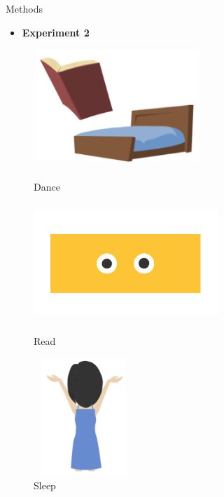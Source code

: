 \documentclass[final]{beamer}
\newlength{\colwidth}
\begin{document}
\begin{frame}[t]
\begin{columns}[t]
\begin{column}{\colwidth}
\begin{block}{Methods}
    \vspace{-0.3in}

    \begin{itemize}
      \item \textbf{Experiment 2}
    \end{itemize}
    \begin{figure}
      \begin{minipage}[t]{0.18\linewidth}
        \centering
        \includegraphics[width=2.5in, height=1.75in]{figures/fraw.png}
        \caption{Dance}
      \end{minipage}
      \begin{minipage}[t]{0.18\linewidth}
        \centering
        \includegraphics[width=2.75in, height=1.75in]{figures/gobb.png}
        \caption{Read}
      \end{minipage}%
      \begin{minipage}[t]{0.18\linewidth}
        \centering
        \includegraphics[width=1.5in, height=1.75in]{figures/plip.png}
        \caption{Sleep}
      \end{minipage}
      \begin{minipage}[t]{0.18\linewidth}
        \centering

\end{minipage}
\end{figure}
\end{block}
\end{column}
\end{columns}
\end{frame}
\end{document}
